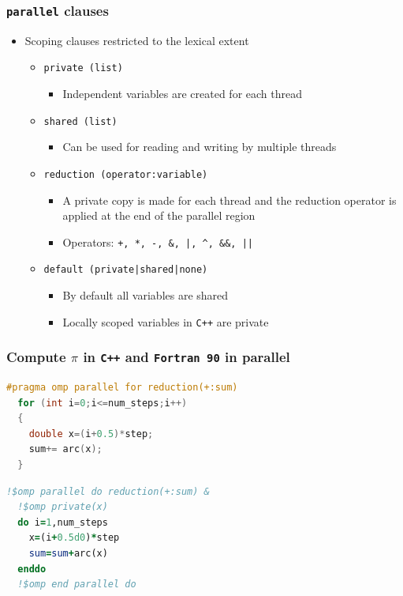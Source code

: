 \documentclass[xcolor=table,10pt,final]{beamer}
\begin{document}
\begin{frame}
  \frametitle{{\tt parallel} clauses}
  \begin{itemize}
    \item Scoping clauses restricted to the lexical extent
      \begin{itemize}
	\itemsep 0.5cm
	\item {\tt private (list)}
	  \begin{itemize}
	    \item Independent variables are created for each thread
	  \end{itemize}
	\item {\tt shared (list)}
	  \begin{itemize}
	    \item Can be used for reading and writing by multiple threads
	  \end{itemize}
	\item {\tt reduction (operator:variable)}
	  \begin{itemize}
	    \item A private copy is made for each thread and the reduction operator is applied at the end of the parallel region
	    \item Operators: {\tt +, *, -, \&, |, \textasciicircum, \&\&, ||}
	  \end{itemize}
	\item {\tt default (private|shared|none)}
	  \begin{itemize}
	    \item By default all variables are shared
	    \item Locally scoped variables in {\tt C++} are private
	  \end{itemize}
      \end{itemize}
  \end{itemize}
\end{frame}

\begin{frame}[fragile]
  \frametitle{Compute $\pi$ in {\tt C++} and {\tt Fortran 90} in parallel}
  \begin{lstlisting}[language=C++,basicstyle=\scriptsize]
#pragma omp parallel for reduction(+:sum)
  for (int i=0;i<=num_steps;i++)
  {
    double x=(i+0.5)*step;
    sum+= arc(x);
  }
  \end{lstlisting}
  \begin{lstlisting}[language=Fortran,basicstyle=\scriptsize]
  !$omp parallel do reduction(+:sum) &
  !$omp private(x)
  do i=1,num_steps
    x=(i+0.5d0)*step
    sum=sum+arc(x)
  enddo
  !$omp end parallel do
  \end{lstlisting}
\end{frame}
\end{document}
